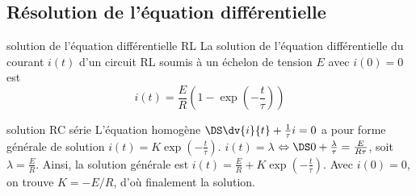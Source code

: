 \documentclass[../main/main.tex]{subfiles}
\begin{document}
\subsection{Résolution de l'équation différentielle}
\begin{tcbraster}[raster columns=2, raster equal height=rows]
    \begin{prop}[label=prop:ucsolu]{solution de l'équation
        différentielle RL}
        La solution de l'équation différentielle du courant $i(t)$
        d'un circuit RL soumis à un échelon de tension $E$ avec
        $i(0) = 0$ est
        \[\boxed{i(t) = \frac{E}{R}\left(1-\exp\left(-\frac{t}{\tau}\right)\right)}\]
    \end{prop}
    \begin{demo}[label=demo:rcsolu]{solution RC série}
        L'équation homogène $\DS\dv{i}{t} + \frac{1}{\tau}i = 0$ a pour forme
        générale de solution $i(t) = K\exp\left( -\frac{t}{\tau}
        \right)$.\smallbreak
        $i(t) = \lambda$ $\Leftrightarrow\DS0 + \frac{\lambda}{\tau} =
        \frac{E}{R\tau}$, soit $\lambda = \frac{E}{R}$.\smallbreak
        Ainsi, la solution générale est $i(t) = \frac{E}{R} + K\exp
        \left(-\frac{t}{\tau} \right)$. Avec $i(0) = 0$, on trouve $K = -E/R$,
        d'où finalement la solution.
    \end{demo}
\end{tcbraster}
\end{document}
